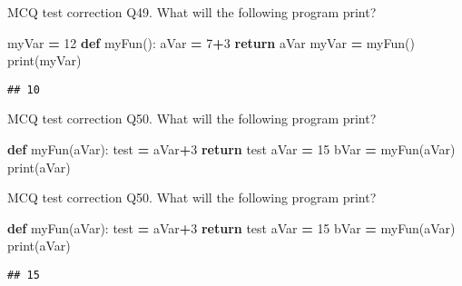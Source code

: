 \documentclass[
  8pt,
  ignorenonframetext,
]{beamer}
\newenvironment{Shaded}{\begin{snugshade}}{\end{snugshade}}
\newcommand{\BuiltInTok}[1]{#1}
\newcommand{\ControlFlowTok}[1]{\textcolor[rgb]{0.13,0.29,0.53}{\textbf{#1}}}
\newcommand{\DecValTok}[1]{\textcolor[rgb]{0.00,0.00,0.81}{#1}}
\newcommand{\KeywordTok}[1]{\textcolor[rgb]{0.13,0.29,0.53}{\textbf{#1}}}
\newcommand{\NormalTok}[1]{#1}
\newcommand{\OperatorTok}[1]{\textcolor[rgb]{0.81,0.36,0.00}{\textbf{#1}}}
\begin{document}
\begin{frame}[fragile]{MCQ test correction}
\protect\hypertarget{mcq-test-correction-97}{}
Q49. What will the following program print?

\begin{Shaded}
\begin{Highlighting}[]
\NormalTok{myVar }\OperatorTok{=} \DecValTok{12}
\KeywordTok{def}\NormalTok{ myFun():}
\NormalTok{    aVar }\OperatorTok{=} \DecValTok{7}\OperatorTok{+}\DecValTok{3}
    \ControlFlowTok{return}\NormalTok{ aVar}
\NormalTok{myVar }\OperatorTok{=}\NormalTok{ myFun()}
\BuiltInTok{print}\NormalTok{(myVar)}
\end{Highlighting}
\end{Shaded}

\begin{verbatim}
## 10
\end{verbatim}
\end{frame}

\begin{frame}[fragile]{MCQ test correction}
\protect\hypertarget{mcq-test-correction-98}{}
Q50. What will the following program print?

\begin{Shaded}
\begin{Highlighting}[]
\KeywordTok{def}\NormalTok{ myFun(aVar):}
\NormalTok{    test }\OperatorTok{=}\NormalTok{ aVar}\OperatorTok{+}\DecValTok{3}
    \ControlFlowTok{return}\NormalTok{ test}
\NormalTok{aVar }\OperatorTok{=} \DecValTok{15}
\NormalTok{bVar }\OperatorTok{=}\NormalTok{ myFun(aVar)}
\BuiltInTok{print}\NormalTok{(aVar)}
\end{Highlighting}
\end{Shaded}
\end{frame}

\begin{frame}[fragile]{MCQ test correction}
\protect\hypertarget{mcq-test-correction-99}{}
Q50. What will the following program print?

\begin{Shaded}
\begin{Highlighting}[]
\KeywordTok{def}\NormalTok{ myFun(aVar):}
\NormalTok{    test }\OperatorTok{=}\NormalTok{ aVar}\OperatorTok{+}\DecValTok{3}
    \ControlFlowTok{return}\NormalTok{ test}
\NormalTok{aVar }\OperatorTok{=} \DecValTok{15}
\NormalTok{bVar }\OperatorTok{=}\NormalTok{ myFun(aVar)}
\BuiltInTok{print}\NormalTok{(aVar)}
\end{Highlighting}
\end{Shaded}

\begin{verbatim}
## 15
\end{verbatim}
\end{frame}
\end{document}
